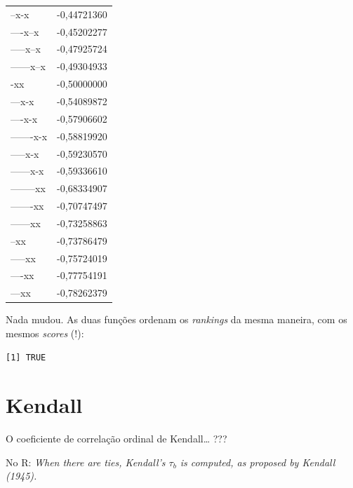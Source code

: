 \documentclass[
  letterpaper,
  DIV=11,
  numbers=noendperiod]{scrreprt}
\newenvironment{Shaded}{\begin{snugshade}}{\end{snugshade}}
\newcommand{\FunctionTok}[1]{\textcolor[rgb]{0.28,0.35,0.67}{#1}}
\newcommand{\NormalTok}[1]{\textcolor[rgb]{0.00,0.23,0.31}{#1}}
\newcommand{\SpecialCharTok}[1]{\textcolor[rgb]{0.37,0.37,0.37}{#1}}
\begin{document}
\begin{longtable*}{lr}
--x-x & -0,44721360 \\ 
----x--x & -0,45202277 \\ 
-----x--x & -0,47925724 \\ 
------x--x & -0,49304933 \\ 
-xx & -0,50000000 \\ 
---x-x & -0,54089872 \\ 
----x-x & -0,57906602 \\ 
-------x-x & -0,58819920 \\ 
-----x-x & -0,59230570 \\ 
------x-x & -0,59336610 \\ 
--------xx & -0,68334907 \\ 
-------xx & -0,70747497 \\ 
------xx & -0,73258863 \\ 
--xx & -0,73786479 \\ 
-----xx & -0,75724019 \\ 
----xx & -0,77754191 \\ 
---xx & -0,78262379 \\ 
\bottomrule
\end{longtable*}

Nada mudou. As duas funções ordenam os \emph{rankings} da mesma maneira,
com os mesmos \emph{scores} (!):

\begin{Shaded}
\end{Shaded}

\begin{verbatim}
[1] TRUE
\end{verbatim}

\section{Kendall}\label{kendall}

O coeficiente de correlação ordinal de Kendall\ldots{} ???

No R: \emph{When there are ties, Kendall's $\tau_b$ is computed, as
proposed by Kendall (1945).}
\end{document}
